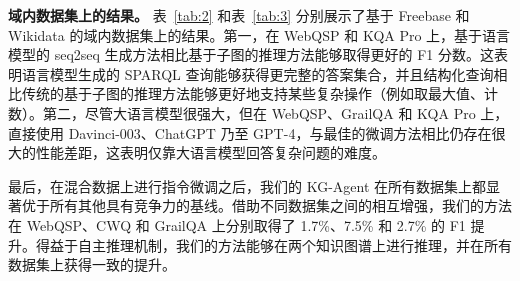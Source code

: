 \documentclass[11pt,UTF8,fontset=fandol]{ctexart}
\begin{document}
\textbf{域内数据集上的结果。}
表~\ref{tab:2} 和表~\ref{tab:3} 分别展示了基于 Freebase 和 Wikidata 的域内数据集上的结果。第一，在 WebQSP 和 KQA Pro 上，基于语言模型的 seq2seq 生成方法相比基于子图的推理方法能够取得更好的 F1 分数。这表明语言模型生成的 SPARQL 查询能够获得更完整的答案集合，并且结构化查询相比传统的基于子图的推理方法能够更好地支持某些复杂操作（例如取最大值、计数）。第二，尽管大语言模型很强大，但在 WebQSP、GrailQA 和 KQA Pro 上，直接使用 Davinci-003、ChatGPT 乃至 GPT-4，与最佳的微调方法相比仍存在很大的性能差距，这表明仅靠大语言模型回答复杂问题的难度。

最后，在混合数据上进行指令微调之后，我们的 KG-Agent 在所有数据集上都显著优于所有其他具有竞争力的基线。借助不同数据集之间的相互增强，我们的方法在 WebQSP、CWQ 和 GrailQA 上分别取得了 1.7\%、7.5\% 和 2.7\% 的 F1 提升。得益于自主推理机制，我们的方法能够在两个知识图谱上进行推理，并在所有数据集上获得一致的提升。
\end{document}
